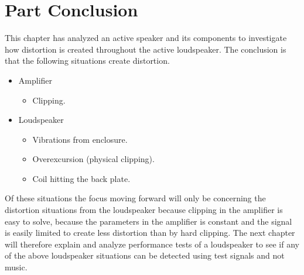 \section{Part Conclusion}
This chapter has analyzed an active speaker and its components to investigate how distortion is created throughout the active loudspeaker. The conclusion is that the following situations create distortion.
\begin{itemize}
\item Amplifier
	\begin{itemize}
	\item Clipping.
	\end{itemize}
\item Loudspeaker
	\begin{itemize}
	\item Vibrations from enclosure.
	\item Overexcursion (physical clipping).
	\item Coil hitting the back plate.
	\end{itemize}
\end{itemize}
Of these situations the focus moving forward will only be concerning the distortion situations from the loudspeaker because clipping in the amplifier is easy to solve, because the parameters in the amplifier is constant and the signal is easily limited to create less distortion than by hard clipping. The next chapter will therefore explain and analyze performance tests of a loudspeaker to see if any of the above loudspeaker situations can be detected using test signals and not music. 